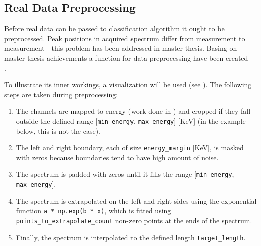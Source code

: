 \subsection{Real Data Preprocessing}
Before real data can be passed to classification algorithm it ought to be preprocessed. 
Peak positions in acquired spectrum differ from measurement to measurement - this problem has been addressed in \cite{Goral2023} master thesis.
Basing on master thesis achievements a function for data preprocessing have been created - .

\newenvironment{longlistingF}{\captionsetup{type=listing, width=0.8\textwidth}}{}
\begin{longlistingF}
    \caption{}
    \label{lst:data_preprocessing}
\end{longlistingF}
\vspace{12pt}

To illustrate its inner workings, a visualization will be used (see ). The following steps are taken during preprocessing:
\begin{enumerate}
    \item The channels are mapped to energy (work done in \cite{Goral2023}) and cropped if they fall outside the defined range [\texttt{min\_energy}, \texttt{max\_energy}] [KeV] (in the example below, this is not the case).
    \item The left and right boundary, each of size \texttt{energy\_margin} [KeV], is masked with zeros because boundaries tend to have high amount of noise.
    \item The spectrum is padded with zeros until it fills the range [\texttt{min\_energy}, \texttt{max\_energy}].
    \item The spectrum is extrapolated on the left and right sides using the exponential function \texttt{a * np.exp(b * x)}, which is fitted using \texttt{points\_to\_extrapolate\_count} non-zero points at the ends of the spectrum.
    \item Finally, the spectrum is interpolated to the defined length \texttt{target\_length}.
\end{enumerate}

